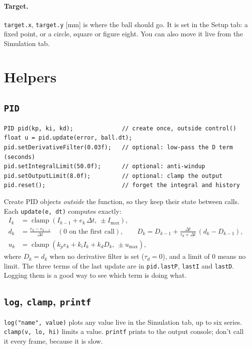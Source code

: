\documentclass[10pt,a4paper]{article}
\begin{document}
\paragraph{Target.} \texttt{target.x}, \texttt{target.y} [mm] is where the ball should go. It is
set in the Setup tab: a fixed point, or a circle, square or figure eight. You can also move it
live from the Simulation tab.

\section{Helpers}
\subsection{\texttt{PID}}
\begin{lstlisting}
PID pid(kp, ki, kd);              // create once, outside control()
float u = pid.update(error, ball.dt);
pid.setDerivativeFilter(0.03f);   // optional: low-pass the D term (seconds)
pid.setIntegralLimit(50.0f);      // optional: anti-windup
pid.setOutputLimit(8.0f);         // optional: clamp the output
pid.reset();                      // forget the integral and history
\end{lstlisting}
Create PID objects \emph{outside} the function, so they keep their state between calls. Each
\texttt{update(e, dt)} computes exactly:
\begin{align}
  I_k &= \operatorname{clamp}\!\left(I_{k-1}+e_k\,\Delta t,\ \pm I_{\max}\right),\\
  d_k &= \frac{e_k-e_{k-1}}{\Delta t}\quad(0\text{ on the first call}),\qquad
  D_k = D_{k-1}+\frac{\Delta t}{\tau_d+\Delta t}\,(d_k-D_{k-1}),\\
  u_k &= \operatorname{clamp}\!\left(k_p e_k+k_i I_k+k_d D_k,\ \pm u_{\max}\right),
\end{align}
where $D_k=d_k$ when no derivative filter is set ($\tau_d=0$), and a limit of 0 means no limit.
The three terms of the last update are in \texttt{pid.lastP}, \texttt{lastI} and
\texttt{lastD}. Logging them is a good way to see which term is doing what.

\subsection{\texttt{log}, \texttt{clamp}, \texttt{printf}}
\texttt{log("name", value)} plots any value live in the Simulation tab, up to six series.
\texttt{clamp(v, lo, hi)} limits a value. \texttt{printf} prints to the output console; don't
call it every frame, because it is slow.
\end{document}
